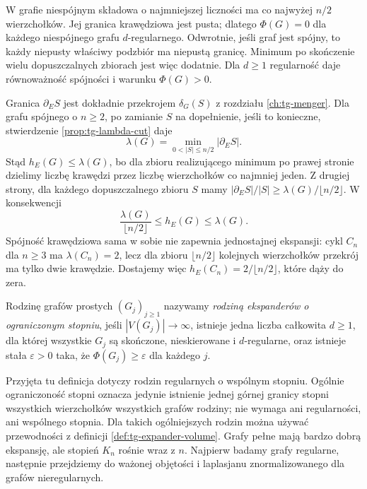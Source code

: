 \begin{uwaga}
W grafie niespójnym składowa o najmniejszej liczności
ma co najwyżej $n/2$ wierzchołków.
Jej granica krawędziowa jest pusta;
dlatego $\Phi(G)=0$ dla każdego niespójnego
grafu $d$-regularnego. Odwrotnie, jeśli graf jest spójny, to każdy
niepusty właściwy podzbiór ma niepustą granicę.
Minimum po skończenie wielu dopuszczalnych zbiorach
jest więc dodatnie. Dla $d\geq1$ regularność daje
równoważność spójności i warunku $\Phi(G)>0$.
\end{uwaga}

\begin{uwaga}
\label{rem:tg-expansion-connectivity}
Granica $\partial_E S$ jest dokładnie przekrojem
$\delta_G(S)$ z rozdziału \ref{ch:tg-menger}.
Dla grafu spójnego o $n\geq2$, po zamianie $S$
na dopełnienie, jeśli to konieczne, stwierdzenie
\ref{prop:tg-lambda-cut} daje
\[
\lambda(G)=\min_{0<|S|\leq n/2}|\partial_E S|.
\]
Stąd $h_E(G)\leq\lambda(G)$, bo dla zbioru
realizującego minimum po prawej stronie dzielimy
liczbę krawędzi przez liczbę wierzchołków co najmniej
jeden. Z drugiej strony, dla każdego dopuszczalnego
zbioru $S$ mamy
$|\partial_E S|/|S|\geq
\lambda(G)/\lfloor n/2\rfloor$.
W konsekwencji
\[
\frac{\lambda(G)}{\lfloor n/2\rfloor}
\leq h_E(G)\leq\lambda(G).
\]
Spójność krawędziowa sama w sobie nie zapewnia
jednostajnej ekspansji: cykl $C_n$ dla $n\geq3$
ma $\lambda(C_n)=2$, lecz dla zbioru
$\lfloor n/2\rfloor$ kolejnych wierzchołków
przekrój ma tylko dwie krawędzie. Dostajemy więc
$h_E(C_n)=2/\lfloor n/2\rfloor$, które dąży do zera.
\end{uwaga}

\begin{definicja}
\label{def:tg-expander-family}
Rodzinę grafów prostych $(G_j)_{j\geq1}$
nazywamy \emph{rodziną ekspanderów
o ograniczonym stopniu}, jeśli
$|V(G_j)|\to\infty$, istnieje jedna
liczba całkowita $d\geq1$, dla której
wszystkie $G_j$ są skończone, nieskierowane
i $d$-regularne,
oraz istnieje stała $\varepsilon>0$
taka, że $\Phi(G_j)\geq\varepsilon$
dla każdego $j$.
\end{definicja}

Przyjęta tu definicja dotyczy rodzin regularnych o wspólnym
stopniu. Ogólnie ograniczoność stopni oznacza jedynie istnienie
jednej górnej granicy stopni wszystkich wierzchołków wszystkich
grafów rodziny; nie wymaga ani regularności, ani wspólnego stopnia.
Dla takich ogólniejszych rodzin można używać przewodności
z definicji \ref{def:tg-expander-volume}.
Grafy pełne mają bardzo dobrą ekspansję,
ale stopień $K_n$ rośnie wraz z $n$.
Najpierw badamy grafy regularne, następnie przejdziemy
do ważonej objętości i laplasjanu znormalizowanego
dla grafów nieregularnych.

